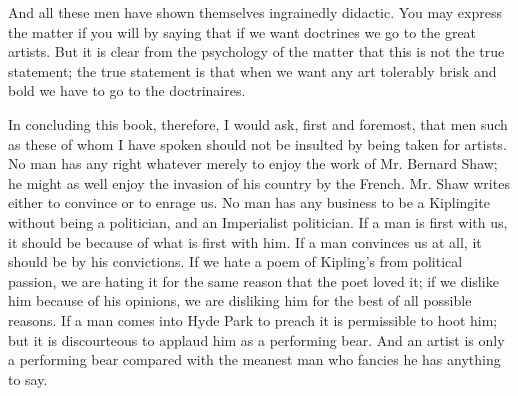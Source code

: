 And all these men have shown themselves ingrainedly didactic. You may express the matter if you will by saying that if we want doctrines we go to the great artists. But it is clear from the psychology of the matter that this is not the true statement; the true statement is that when we want any art tolerably brisk and bold we have to go to the doctrinaires.

In concluding this book, therefore, I would ask, first and foremost, that men such as these of whom I have spoken should not be insulted by being taken for artists. No man has any right whatever merely to enjoy the work of Mr. Bernard Shaw; he might as well enjoy the invasion of his country by the French. Mr. Shaw writes either to convince or to enrage us. No man has any business to be a Kiplingite without being a politician, and an Imperialist politician. If a man is first with us, it should be because of what is first with him. If a man convinces us at all, it should be by his convictions. If we hate a poem of Kipling’s from political passion, we are hating it for the same reason that the poet loved it; if we dislike him because of his opinions, we are disliking him for the best of all possible reasons. If a man comes into Hyde Park to preach it is permissible to hoot him; but it is discourteous to applaud him as a performing bear. And an artist is only a performing bear compared with the meanest man who fancies he has anything to say.

